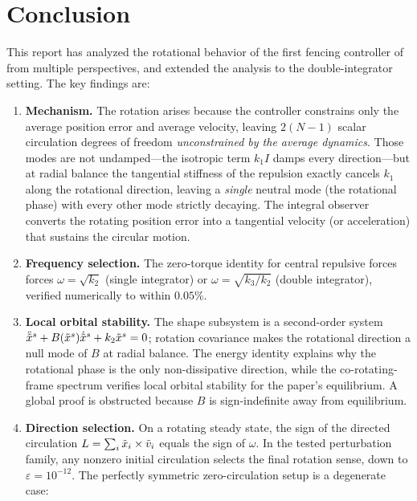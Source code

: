 \section{Conclusion}
\label{sec:conclusion}

This report has analyzed the rotational behavior of the first fencing controller of
\cite{kou2022cooperative} from multiple perspectives, and extended the analysis to the
double-integrator setting. The key findings are:

\begin{enumerate}[leftmargin=2.5em]
  \item \textbf{Mechanism.} The rotation arises because the controller constrains only the average
        position error and average velocity, leaving $2(N-1)$ scalar circulation degrees of freedom
        \emph{unconstrained by the average dynamics}. Those modes are not undamped---the isotropic term
        $k_1I$ damps every direction---but at radial balance the tangential stiffness of the repulsion
        exactly cancels $k_1$ along the rotational direction, leaving a \emph{single} neutral mode (the
        rotational phase) with every other mode strictly decaying. The integral observer converts the
        rotating position error into a tangential velocity (or acceleration) that sustains the circular
        motion.
  \item \textbf{Frequency selection.} The zero-torque identity for central repulsive forces forces
        $\omega=\sqrt{k_2}$ (single integrator) or $\omega=\sqrt{k_3/k_2}$ (double integrator),
        verified numerically to within $0.05\%$.
  \item \textbf{Local orbital stability.} The shape subsystem is a second-order system
        $\ddot{\tilde{x}}^s+B(\tilde{x}^s)\dot{\tilde{x}}^s+k_2\tilde{x}^s=0$; rotation covariance makes the rotational
        direction a null mode of $B$ at radial balance. The energy identity explains why the
        rotational phase is the only non-dissipative direction, while the co-rotating-frame spectrum
        verifies local orbital stability for the paper's equilibrium. A global proof is obstructed
        because $B$ is sign-indefinite away from equilibrium.
  \item \textbf{Direction selection.} On a rotating steady state, the sign of the directed
        circulation $L=\sum_i\tilde{x}_i\times\tilde{v}_i$ equals the sign of $\omega$. In the tested
        perturbation family, any nonzero initial circulation selects the final rotation sense, down to
        $\varepsilon=10^{-12}$. The perfectly symmetric zero-circulation setup is a degenerate case:

\end{enumerate}
